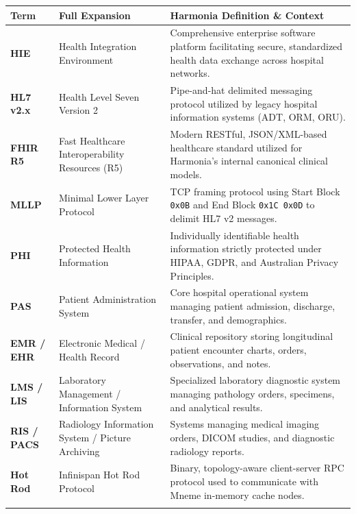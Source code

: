 \begin{table}[htbp]
\centering
\small
\begin{tabularx}{\textwidth}{l P{4.0cm} Y}
\toprule
\textbf{Term} & \textbf{Full Expansion} & \textbf{Harmonia Definition \& Context} \\
\midrule
\textbf{HIE} & Health Integration Environment & Comprehensive enterprise software platform facilitating secure, standardized health data exchange across hospital networks. \\
\addlinespace
\textbf{HL7 v2.x} & Health Level Seven Version 2 & Pipe-and-hat delimited messaging protocol utilized by legacy hospital information systems (ADT, ORM, ORU). \\
\addlinespace
\textbf{FHIR R5} & Fast Healthcare Interoperability Resources (R5) & Modern RESTful, JSON/XML-based healthcare standard utilized for Harmonia's internal canonical clinical models. \\
\addlinespace
\textbf{MLLP} & Minimal Lower Layer Protocol & TCP framing protocol using Start Block \texttt{0x0B} and End Block \texttt{0x1C 0x0D} to delimit HL7 v2 messages. \\
\addlinespace
\textbf{PHI} & Protected Health Information & Individually identifiable health information strictly protected under HIPAA, GDPR, and Australian Privacy Principles. \\
\addlinespace
\textbf{PAS} & Patient Administration System & Core hospital operational system managing patient admission, discharge, transfer, and demographics. \\
\addlinespace
\textbf{EMR / EHR} & Electronic Medical / Health Record & Clinical repository storing longitudinal patient encounter charts, orders, observations, and notes. \\
\addlinespace
\textbf{LMS / LIS} & Laboratory Management / Information System & Specialized laboratory diagnostic system managing pathology orders, specimens, and analytical results. \\
\addlinespace
\textbf{RIS / PACS} & Radiology Information System / Picture Archiving & Systems managing medical imaging orders, DICOM studies, and diagnostic radiology reports. \\
\addlinespace
\textbf{Hot Rod} & Infinispan Hot Rod Protocol & Binary, topology-aware client-server RPC protocol used to communicate with Mneme in-memory cache nodes. \\
\addlinespace
{} \\

\end{tabularx}
\end{table}
